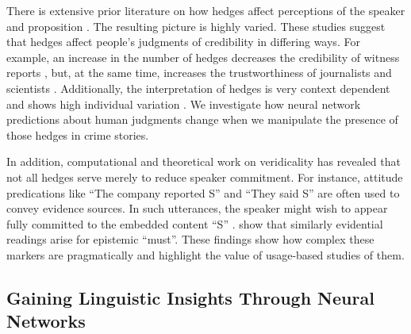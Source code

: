 \documentclass[11pt,a4paper]{article}
\begin{document}
There is extensive prior literature on how hedges affect perceptions of the speaker and proposition \citep{Erickson-etal:1978, durik2008effects, bonnefon2006tactful, rubin:2007:ShortPapers, jensen2008scientific, ferson2015natural}.  The resulting picture is highly varied. 
These studies suggest that hedges affect people's judgments of credibility in differing ways. For example, an increase in the number of hedges decreases the credibility of witness reports \citep{Erickson-etal:1978}, but, at the same time, increases the trustworthiness of journalists and scientists \citep{jensen2008scientific}. Additionally, the interpretation of hedges is very context dependent \citep{bonnefon2006tactful,durik2008effects,ferson2015natural} and shows high individual variation \citep{rubin:2007:ShortPapers,ferson2015natural}. 
We investigate how neural network predictions about human judgments change when we manipulate the presence of those hedges in crime stories.

In addition, computational and theoretical work on veridicality has revealed that not all hedges serve merely to reduce speaker commitment. For instance, attitude predications like ``The company reported S'' and ``They said S'' are often used to convey evidence sources. In such utterances, the speaker might wish to appear fully committed to the embedded content ``S'' \citep{Simons07,deMarneffe:Manning:Potts:2012,White:Rawlins:2018,White-etal:2018}. \citet{vonFintel:Gillies:2010} show that similarly evidential readings arise for epistemic ``must''. These findings show how complex these markers are pragmatically and highlight the value of usage-based studies of them.


\subsection{Gaining Linguistic Insights Through Neural Networks}
\end{document}
